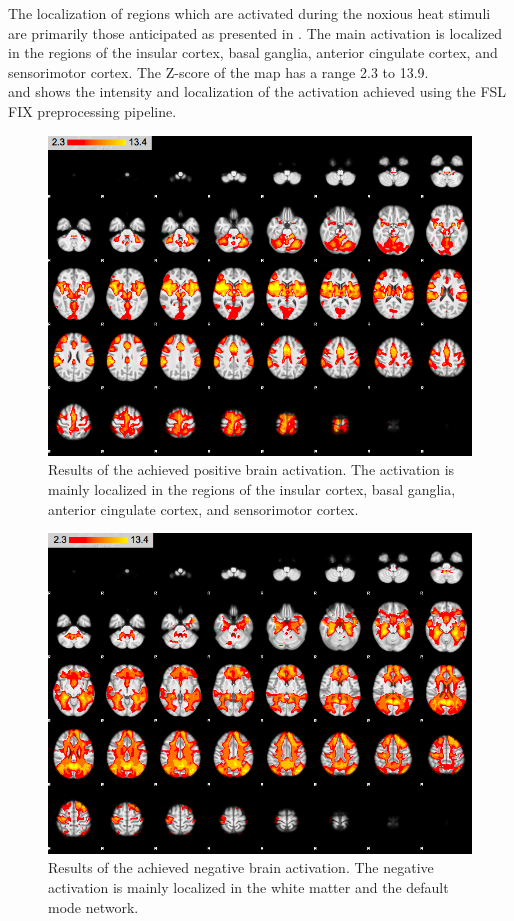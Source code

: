 The localization of regions which are activated during the noxious heat stimuli are primarily those anticipated as presented in . The main activation is localized in the regions of the insular cortex, basal ganglia, anterior cingulate cortex, and sensorimotor cortex. The Z-score of the map has a range 2.3 to 13.9. \\
 and  shows the intensity and localization of the activation achieved using the FSL FIX preprocessing pipeline. 

\begin{figure}[H]                 
	\includegraphics[width=.65\textwidth]{figures/Results/FIX_pos}  
	\caption{Results of the achieved positive brain activation. The activation is mainly localized in the regions of the insular cortex, basal ganglia, anterior cingulate cortex, and sensorimotor cortex.}
	\label{fig:res:FIXpos} 
\end{figure}

\begin{figure}[H]                 
	\includegraphics[width=.65\textwidth]{figures/Results/FIX_neg}  
	\caption{Results of the achieved negative brain activation. The negative activation is mainly localized in the white matter and the default mode network.}
	\label{fig:res:FIXneg} 
\end{figure}

